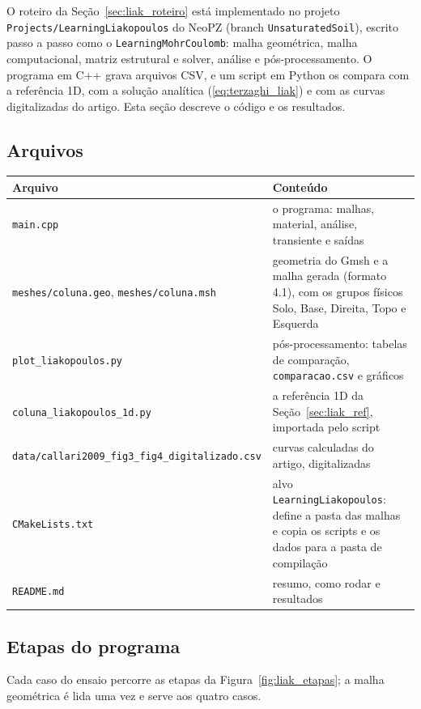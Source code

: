 \documentclass[11pt,a4paper]{article}
\begin{document}
O roteiro da Seção~\ref{sec:liak_roteiro} está implementado no projeto
\texttt{Projects/LearningLiakopoulos} do NeoPZ (branch \texttt{UnsaturatedSoil}), escrito passo a
passo como o \texttt{LearningMohrCoulomb}: malha geométrica, malha computacional, matriz estrutural
e solver, análise e pós-processamento. O programa em C++ grava arquivos CSV, e um script em Python
os compara com a referência 1D, com a solução analítica (\ref{eq:terzaghi_liak}) e com as curvas
digitalizadas do artigo. Esta seção descreve o código e os resultados.

\subsection{Arquivos}

\begin{center}\small
\begin{tabularx}{\textwidth}{@{}>{\raggedright\arraybackslash}p{7.1cm} >{\raggedright\arraybackslash}X@{}}
\toprule
Arquivo & Conteúdo\\
\midrule
\texttt{main.cpp} & o programa: malhas, material, análise, transiente e saídas\\
\texttt{meshes/coluna.geo}, \texttt{meshes/coluna.msh} & geometria do Gmsh e a malha gerada
  (formato 4.1), com os grupos físicos Solo, Base, Direita, Topo e Esquerda\\
\texttt{plot\_liakopoulos.py} & pós-processamento: tabelas de comparação, \texttt{comparacao.csv} e
  gráficos\\
\texttt{coluna\_liakopoulos\_1d.py} & a referência 1D da Seção~\ref{sec:liak_ref}, importada pelo
  script\\
\texttt{data/}\allowbreak\texttt{callari2009\_fig3\_fig4\_digitalizado.csv} & curvas calculadas do artigo,
  digitalizadas\\
\texttt{CMakeLists.txt} & alvo \texttt{LearningLiakopoulos}: define a pasta das malhas e copia os
  scripts e os dados para a pasta de compilação\\
\texttt{README.md} & resumo, como rodar e resultados\\
\bottomrule
\end{tabularx}
\end{center}

\subsection{Etapas do programa}
\label{sec:liak_etapas}

Cada caso do ensaio percorre as etapas da Figura~\ref{fig:liak_etapas}; a malha geométrica é lida
uma vez e serve aos quatro casos.
\end{document}
